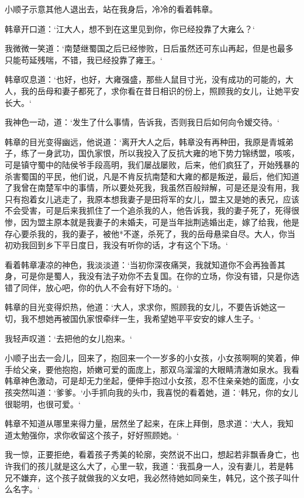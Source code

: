 小顺子示意其他人退出去，站在我身后，冷冷的看着韩章。

韩章开口道：‘江大人，想不到在这里见到你，你已经投靠了大雍么？‘

我微微一笑道：‘南楚继蜀国之后已经惨败，日后虽然还可东山再起，但是也最多只能苟延残喘，不错，我已经投靠了雍王。‘

韩章叹息道：‘也好，也好，大雍强盛，那些人鼠目寸光，没有成功的可能的，大人，我的岳母和妻子都死了，求你看在昔日相识的份上，照顾我的女儿，让她平安长大。‘

我神色一动，道：‘发生了什么事情，告诉我，否则我日后如何向令嫒交待。‘

韩章的目光变得幽远，他说道：‘离开大人之后，韩章没有再种田，我原是青城弟子，练了一身武功，国仇家恨，所以我投入了反抗大雍的地下势力锦绣盟，咳咳，可是镇守蜀中的陆侯爷手段高明，我们屡战屡败，后来，他们疯狂了，开始残暴的杀害蜀国的平民，他们说，凡是不肯反抗南楚和大雍的都是叛逆，最后，他们知道了我曾在南楚军中的事情，所以要处死我，我虽然百般辩解，可是还是没有用，我只有抱着女儿逃走了，我原本想我妻子是田将军的女儿，盟主又是她的表兄，应该不会受害，可是后来我抓住了一个追杀我的人，他告诉我，我的妻子死了，死得很惨，因为盟主原本就是我妻子的未婚夫，可是当年拙荆逃婚出走，嫁了给我，他是存心要杀我的，我的妻子，被他*不遂，杀死了，我的岳母悬梁自尽。大人，你当初劝我回到乡下平日度日，我没有听你的话，才有这个下场。‘

看着韩章凄凉的神色，我淡淡道：‘当初你深夜痛哭，我就知道你不会再独善其身，可是你是蜀人，我没有法子劝你不去复国。在你的立场，你没有错，只是你选错了同伴，放心吧，你的仇人不会有好下场的。‘

韩章的目光变得炽热，他道：‘大人，求求你，照顾我的女儿，不要告诉她这一切，我不想她再被国仇家恨牵绊一生，我希望她平平安安的嫁人生子。‘

我轻声叹道：‘去把他的女儿抱来。‘

小顺子出去一会儿，回来了，抱回来一个一岁多的小女孩，小女孩啊啊的笑着，伸手给父亲，要他抱抱，娇嫩可爱的面庞上，那双乌溜溜的大眼睛清澈如泉水。我看韩章神色激动，可是却无力坐起，便伸手抱过小女孩，忍不住亲亲她的面庞，小女孩突然叫道：‘爹爹。‘小手抓向我的头巾，我喜悦的看着她，道：‘韩兄，你的女儿很聪明，也很可爱。‘

韩章不知道从哪里来得力量，居然坐了起来，在床上拜倒，恳求道：‘大人，我知道太勉强你，求你收留这个孩子，好好照顾她。‘

我一惊，正要拒绝，看着孩子秀美的轮廓，突然说不出口，想起若非飘香身亡，也许我们的孩儿就是这么大了，心里一软，我道：‘我孤身一人，没有妻儿，若是韩兄不嫌弃，这个孩子就做我的义女吧，我必然待她如同亲生，韩兄，这个孩子叫什么名字。‘

